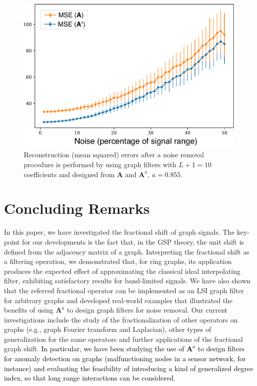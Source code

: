 \begin{figure}[t!]
	\centering
\includegraphics[width=0.95\linewidth]{Figures/ERROR_errobar_filtrados.pdf}
	\caption{Reconstruction (mean squared) errors after a noise removal procedure is performed by using graph filters with $L+1=10$ coefficients and designed from $\mathbf{A}$ and $\mathbf{A}^a$, $a=0.855$.}%
	\label{fig:usa05}%
	\vspace{-0.1cm}
\end{figure}

\section{Concluding Remarks}\label{sec:conc}
In this paper, we have investigated the fractional shift of graph signals. The key-point for our developments is the fact that, in the GSP theory, the unit shift is defined from the adjacency matrix of a graph. Interpreting the fractional shift as a filtering operation, we demonstrated that, for ring graphs, its application produces the expected effect of approximating the classical ideal interpolating filter, exhibiting satisfactory results for band-limited signals. We have also shown that the referred fractional operator can be implemented as an LSI graph filter for arbitrary graphs and developed real-world examples that illustrated the benefits of using $\mathbf{A}^a$ to design graph filters for noise removal. Our current investigations include the study of the fractionalization of other operators on graphs (e.g., graph Fourier transform and Laplacian), other types of generalization for the same operators and further applications of the fractional graph shift. \textcolor{black}{In particular, we have been studying the use of $\mathbf{A}^a$ to design filters for anomaly detection on graphs (malfunctioning nodes in a sensor network, for instance) and evaluating the feasibility of introducing a kind of generalized degree index, so that long range interactions can be considered.}


